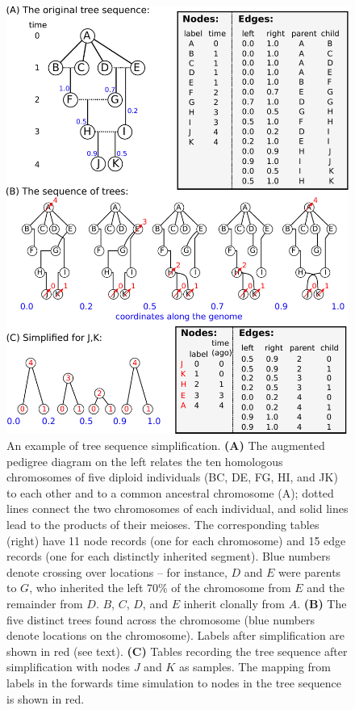 \documentclass{article}
\begin{document}
\begin{figure}
    \begin{center}
        \includegraphics{method_diagram}
    \end{center}
    \caption{
        An example of tree sequence simplification.
        \textbf{(A)} The augmented pedigree diagram on the left
        relates the ten homologous chromosomes of five diploid individuals (BC, DE, FG, HI, and JK)
        to each other and to a common ancestral chromosome (A);
        dotted lines connect the two chromosomes of each individual,
        and solid lines lead to the products of their meioses.
        The corresponding tables (right) have 11 node records (one for each chromosome)
        and 15 edge records (one for each distinctly inherited segment).
        Blue numbers denote crossing over locations --
        for instance, $D$ and $E$ were parents to $G$,
        who inherited the left 70\% of the chromosome from $E$ and the remainder from $D$.
        $B$, $C$, $D$, and $E$ inherit clonally from $A$.
        \textbf{(B)} The five distinct trees
        found across the chromosome (blue numbers denote locations on the chromosome).
        Labels after simplification are shown in red (see text).
        \textbf{(C)} Tables recording the tree sequence after simplification
        with nodes $J$ and $K$ as samples.
        The mapping from labels in the forwards time simulation to nodes in the tree sequence
        is shown in red.
        \label{fig:method_diagram}
    }
\end{figure}
\end{document}
